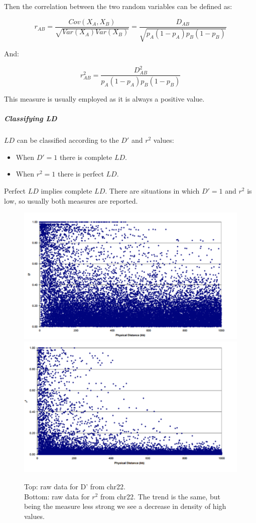 				Then the correlation between the two random variables can be defined as:

				$$r_{AB} = \frac{Cov(X_A, X_B)}{\sqrt{Var(X_A)Var(X_B)}} = \frac{D_{AB}}{\sqrt{p_A(1-p_A)p_B(1-p_B)}}$$

				And:

				$$r^2_{AB} = \frac{D^2_{AB}}{p_A(1-p_A)p_B(1-p_B)}$$

				This measure is usually employed as it is always a positive value.

				\subparagraph{Classifying LD}
				$LD$ can be classified according to the $D'$ and $r^2$ values:

				\begin{multicols}{2}
					\begin{itemize}
						\item When $D'= 1$ there is complete $LD$.
						\item When $r^2 = 1$ there is perfect $LD$.
					\end{itemize}
				\end{multicols}

				Perfect $LD$ implies complete $LD$.
				There are situations in which $D'=1$ and $r^2$ is low, so usually both measures are reported.
				
				\begin{figure}[H]
				\centering
				\includegraphics[scale=0.25]{d22}
				\includegraphics[scale=0.25]{r22}
				\caption{Top: raw data for D' from chr22.\\
				Bottom: raw data for $r^2$ from chr22. The trend is the same, but being the measure less strong we see a decrease in density of high values.
				}
				\label{fig:compare}
				\end{figure}
				
